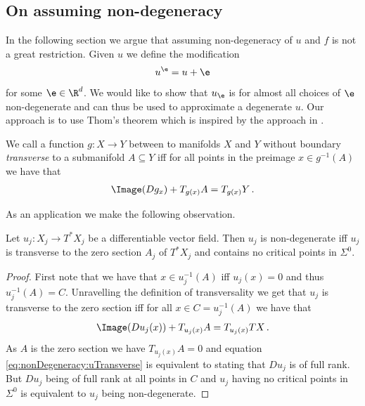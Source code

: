\subsection{On assuming non-degeneracy}

In the following section we argue that assuming non-degeneracy 
of $u$ and $f$ is not a great restriction.
Given $u$ we define the modification
\begin{align}
  u^\e=u+\e\label{eq:nonDegeneracy:definitionUEps}
\end{align}
for some $\e\in\R^d$. We would like to show that $u_\e$ is for almost all choices of $\e$ non-degenerate and can 
thus be used to approximate a degenerate $u$.
Our approach is to use Thom's theorem which is inspired by the approach in \cite[Chapter 6]{Hirsch1994}.
\begin{definition}[Transversality]
  We call a function $g\colon X\to Y$ between to manifolds $X$ and $Y$ without boundary
  \emph{transverse} to a submanifold $A\subseteq Y$ iff for all points in the 
  preimage $x\in g^{-1}(A)$ we have that
  \begin{align*}
    \Image(Dg_x)+T_{g(x)}A = T_{g(x)}Y\,.
  \end{align*}
\end{definition}
As an application we make the following observation.
\begin{proposition}\label{pr:nonDegeneracy:alternativeCharacterisation}
  Let $u_j\colon X_j\to T^*X_j$ be a differentiable vector field.
  Then $u_j$ is non-degenerate iff $u_j$ is transverse to the zero section $A_j$ of $T^*X_j$
  and contains no critical points in $\Sigma^0$.
\end{proposition}
\begin{proof}
  First note that we have that $x\in u_j^{-1}(A)$ iff $u_j(x)=0$ and thus $u_j^{-1}(A)=C$.
  Unravelling the definition of transversality we get that $u_j$ is transverse to the zero section iff for all $x\in C=u_j^{-1}(A)$
  we have that
  \begin{align}
    \Image(Du_j(x))+T_{u_j(x)}A = T_{u_j(x)}TX\,. \label{eq:nonDegeneracy:uTransverse}
  \end{align}
  As $A$ is the zero section we have $T_{u_j(x)}A=0$ and equation \eqref{eq:nonDegeneracy:uTransverse}
  is equivalent to stating that $Du_j$ is of full rank. But $Du_j$ being of full rank at all points
  in $C$ and $u_j$ having no critical points in $\Sigma^0$ is equivalent to $u_j$ being non-degenerate.
\end{proof}
